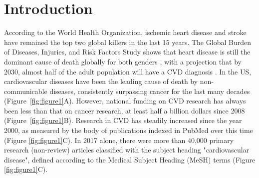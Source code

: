 \documentclass[letter]{bib}
\begin{document}
\section*{Introduction}
	
According to the World Health Organization, ischemic heart disease and stroke have remained the top two global killers in the last 15 years. The Global Burden of Diseases, Injuries, and Risk Factors Study shows that
heart disease is still the dominant cause of death globally for both genders \citep{Roth:2018:Global}, with a projection that by 2030, almost half of the adult population will have a CVD diagnosis \citep{Leopold:2018:Emerging,Heidenreich:2011:Forecasting}. In the US, cardiovascular diseases have been the leading cause of death by non-communicable diseases, consistently surpassing cancer for the last many decades (Figure~\ref{fig:figure1}A). However,  national funding on CVD research has always been less than that on cancer research, at least half a billion dollars since 2008 (Figure~\ref{fig:figure1}B). Research in CVD has steadily increased since the year 2000, as measured by the body of publications indexed in PubMed over this time (Figure \ref{fig:figure1}C).  In 2017 alone, there were more than 40,000 primary research (non-review) articles classified with the subject heading "cardiovascular disease", defined according to the Medical Subject Heading (MeSH) terms (Figure \ref{fig:figure1}C).   
\end{document}
